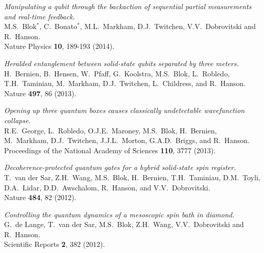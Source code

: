 \begin{enumerate}
{\item {\em Manipulating a qubit through the backaction of sequential partial measurements and real-time feedback.} \\
 M.S.~Blok$^*$, C.~Bonato$^*$, M.L.~Markham, D.J.~Twitchen, V.V.~Dobrovitski and R.~Hanson.  \\
Nature Physics \textbf{10}, 189-193 (2014).

\item {\em Heralded entanglement between solid-state qubits separated by three meters.} \\
H.~Bernien, B.~Hensen, W.~Pfaff, G.~Koolstra, M.S.~Blok, L.~Robledo, T.H.~Taminiau, M.~Markham, D.J.~Twitchen, L.~Childress, and R.~Hanson. \\
 Nature \textbf{497}, 86 (2013).

\item {\em Opening up three quantum boxes causes classically undetectable wavefunction collapse.}\\ 
R.E.~George, L.~Robledo, O.J.E.~Maroney, M.S.~Blok, H.~Bernien, M.~Markham, D.J.~Twitchen, J.J.L.~Morton, G.A.D.~Briggs, and R.~Hanson. \\
 Proceedings of the National Academy of Sciences \textbf{110}, 3777 (2013).
\clearpage
\item {\em Decoherence-protected quantum gates for a hybrid solid-state spin register.} \\
T.~van der Sar, Z.H.~Wang, M.S.~Blok, H.~Bernien, T.H.~Taminiau, D.M.~Toyli, D.A.~Lidar, D.D.~Awschalom, R.~Hanson, and V.V.~Dobrovitski. \\ 
Nature \textbf{484}, 82 (2012).

\item {\em Controlling the quantum dynamics of a mesoscopic spin bath in diamond.} \\
G.~de Lange, T.~van der Sar, M.S.~Blok, Z.H.~Wang, V.V.~Dobrovitski and R.~Hanson. \\
 Scientific Reports \textbf{2}, 382 (2012).
}




\end{enumerate}